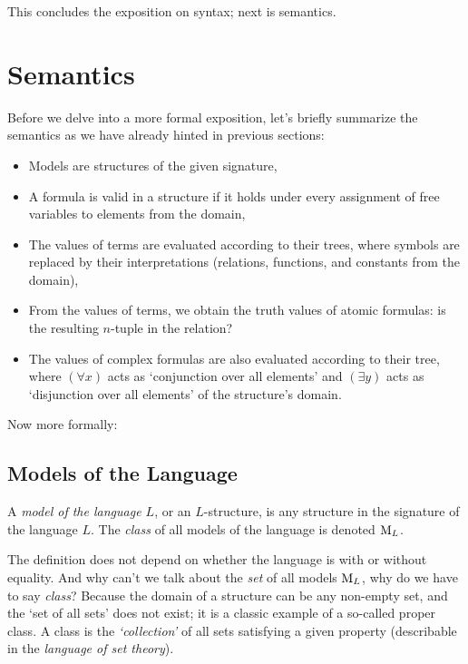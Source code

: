 This concludes the exposition on syntax; next is semantics.


\section{Semantics}\label{section:predicate-semantics}

Before we delve into a more formal exposition, let's briefly summarize the semantics as we have already hinted in previous sections:

\begin{itemize}
    \item Models are structures of the given signature,
    \item A formula is valid in a structure if it holds under every assignment of free variables to elements from the domain,
    \item The values of terms are evaluated according to their trees, where symbols are replaced by their interpretations (relations, functions, and constants from the domain),
    \item From the values of terms, we obtain the truth values of atomic formulas: is the resulting $n$-tuple in the relation?
    \item The values of complex formulas are also evaluated according to their tree, where $(\forall x)$ acts as `conjunction over all elements' and $(\exists y)$ acts as `disjunction over all elements' of the structure's domain.
\end{itemize}

Now more formally:

\subsection{Models of the Language}

\begin{definition}
A \emph{model of the language $L$}, or an $L$-structure, is any structure in the signature of the language $L$. The \emph{class} of all models of the language is denoted $\operatorname{M}_L$.
\end{definition}

\begin{remark}
The definition does not depend on whether the language is with or without equality. And why can't we talk about the \emph{set} of all models $\operatorname{M}_L$, why do we have to say \emph{class}? Because the domain of a structure can be any non-empty set, and the `set of all sets' does not exist; it is a classic example of a so-called proper class. A class is the \emph{`collection'} of all sets satisfying a given property (describable in the \emph{language of set theory}).
\end{remark}

